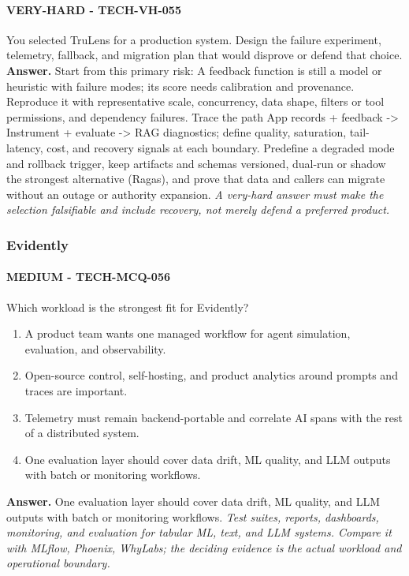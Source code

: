 \paragraph{VERY-HARD - TECH-VH-055} You selected TruLens for a production system. Design the failure experiment, telemetry, fallback, and migration plan that would disprove or defend that choice.
\textbf{Answer.} Start from this primary risk: A feedback function is still a model or heuristic with failure modes; its score needs calibration and provenance. Reproduce it with representative scale, concurrency, data shape, filters or tool permissions, and dependency failures. Trace the path App records + feedback -> Instrument + evaluate -> RAG diagnostics; define quality, saturation, tail-latency, cost, and recovery signals at each boundary. Predefine a degraded mode and rollback trigger, keep artifacts and schemas versioned, dual-run or shadow the strongest alternative (Ragas), and prove that data and callers can migrate without an outage or authority expansion.
\textit{A very-hard answer must make the selection falsifiable and include recovery, not merely defend a preferred product.}
\subsubsection*{Evidently}
\paragraph{MEDIUM - TECH-MCQ-056} Which workload is the strongest fit for Evidently?
\begin{enumerate}[label=\Alph*.]
\item A product team wants one managed workflow for agent simulation, evaluation, and observability.
\item Open-source control, self-hosting, and product analytics around prompts and traces are important.
\item Telemetry must remain backend-portable and correlate AI spans with the rest of a distributed system.
\item One evaluation layer should cover data drift, ML quality, and LLM outputs with batch or monitoring workflows.
\end{enumerate}
\textbf{Answer.} One evaluation layer should cover data drift, ML quality, and LLM outputs with batch or monitoring workflows.
\textit{Test suites, reports, dashboards, monitoring, and evaluation for tabular ML, text, and LLM systems. Compare it with MLflow, Phoenix, WhyLabs; the deciding evidence is the actual workload and operational boundary.}
